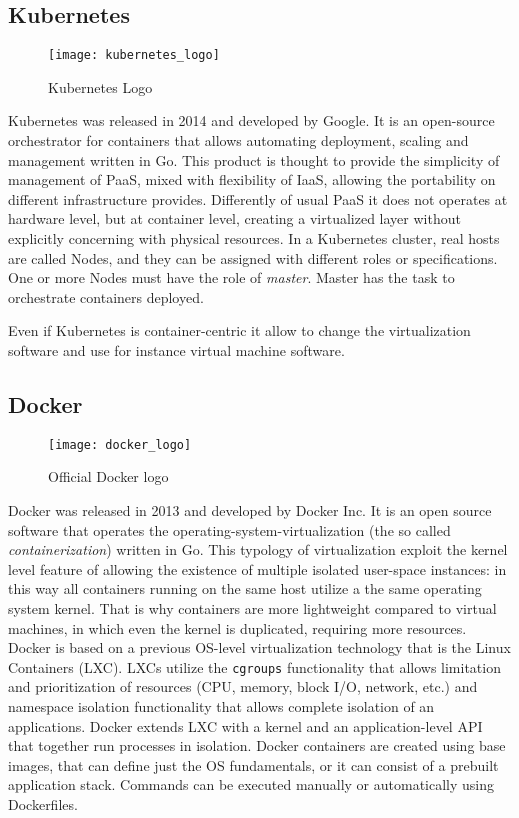 \subsection{Kubernetes}
\begin{figure}[h]
  \centering \texttt{[image: kubernetes\_logo]}
  \caption{Kubernetes Logo}
  \label{chap:intro:img:k8s_logo}
\end{figure}
Kubernetes was released in 2014 and developed by Google. It is an open-source
orchestrator for containers that allows automating deployment, scaling and
management written in Go. This product is thought to provide the simplicity of
management of PaaS, mixed with flexibility of IaaS, allowing the portability on
different infrastructure provides. Differently of usual PaaS it does not
operates at hardware level, but at container level, creating a virtualized layer
without explicitly concerning with physical resources. In a Kubernetes cluster,
real hosts are called Nodes, and they can be assigned with different roles or
specifications. One or more Nodes must have the role of \emph{master}. Master
has the task to orchestrate containers deployed. 

Even if Kubernetes is container-centric it allow to change the virtualization
software and use for instance virtual machine software.


\subsection{Docker}
\begin{figure}[t]
  \centering \texttt{[image: docker\_logo]}
  \caption{Official Docker logo}
  \label{chap:intro:img:docker_logo}
\end{figure}
Docker was released in 2013 and developed by Docker Inc. It is an open source
software that operates the operating-system-virtualization (the so called 
\emph{containerization}) written in Go. This typology of virtualization exploit
the kernel level feature of allowing the existence of multiple isolated
user-space instances: in this way all containers running on the same host
utilize a the same operating system kernel. That is why containers are more
lightweight compared to virtual machines, in which even the kernel is
duplicated, requiring more resources. Docker is based on a previous OS-level
virtualization technology that is the Linux Containers (LXC). LXCs utilize the 
\texttt{cgroups} functionality that allows limitation and prioritization of
resources (CPU, memory, block I/O, network, etc.) and namespace isolation
functionality that allows complete isolation of an applications. Docker extends
LXC with a kernel and an application-level API that together run processes in
isolation. Docker containers are created using base images, that can define just
the OS fundamentals, or it can consist of a prebuilt application stack.
Commands can be executed manually or automatically using Dockerfiles.

